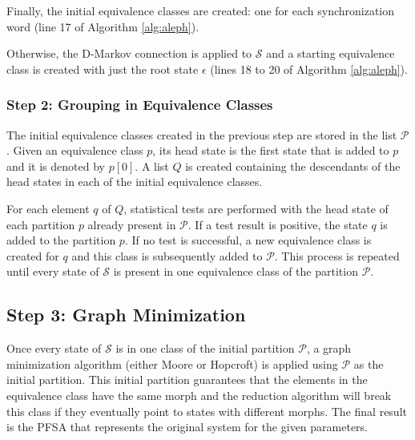 {Finally, the initial equivalence classes are created: one for each synchronization word (line 17 of Algorithm \ref{alg:aleph}).

Otherwise, the D-Markov connection is applied to $\mathcal{S}$ and a starting equivalence class is created with just the root state $\epsilon$ (lines 18 to 20 of Algorithm \ref{alg:aleph}). 

\subsubsection{Step 2: Grouping in Equivalence Classes}

The initial equivalence classes created in the previous step are stored in the list $\mathcal{P}$. Given an equivalence class $p$, its head state is the first state that is added to $p$ and it is denoted by $p[0]$. A list $Q$ is created containing the descendants of the head states in each of the initial equivalence classes.  

For each element $q$ of $Q$, statistical tests are performed with the head state of each partition $p$ already present in $\mathcal{P}$. If a test result is positive, the state $q$ is added to the partition $p$. If no test is successful, a new equivalence class is created for $q$ and this class is subsequently added to $\mathcal{P}$. This process is repeated until every state of $\mathcal{S}$ is present in one equivalence class of the partition $\mathcal{P}$.

\subsection{Step 3: Graph Minimization}

  Once every state of $\mathcal{S}$ is in one class of the initial partition $\mathcal{P}$, a graph minimization algorithm (either Moore or Hopcroft) is applied using $\mathcal{P}$ as the initial partition. This initial partition guarantees that the elements in the equivalence class have the same morph and the reduction algorithm will break this class if they eventually point to states with different morphs.  The final result is the PFSA that represents the original system for the given parameters.  

}
